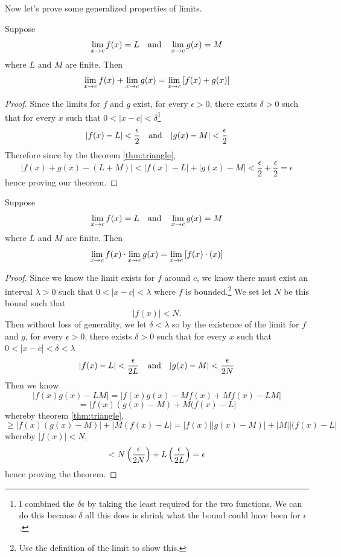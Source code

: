 Now let's prove some generalized properties of limits.

\begin{theorem}
Suppose
$$\lim_{x\to c}f(x)=L \quad\text{and}\quad \lim_{x\to c}g(x)=M$$
where $L$ and $M$ are finite. Then
$$\lim_{x\to c}f(x)+\lim_{x\to c}g(x)=\lim_{x\to c}\left[f(x)+g(x)\right]$$
\end{theorem}
\begin{proof}
	Since the limits for $f$ and $g$ exist, for every $\epsilon>0$, there exists $\delta>0$ such that for every $x$ such that $0<|x-c|<\delta$\footnote{I combined the $\delta$s by taking the least required for the two functions. We can do this because $\delta$ all this does is shrink what the bound could have been for $\epsilon$.}
	$$|f(x)-L|<\frac{\epsilon}{2} \quad\text{and}\quad |g(x)-M|<\frac{\epsilon}{2}$$
	Therefore since by the theorem \eqref{thm:triangle},
	$$|f(x)+g(x)-(L+M)|<|f(x)-L|+|g(x)-M|<\frac{\epsilon}{2}+\frac{\epsilon}{2}=\epsilon$$
	hence proving our theorem.
\end{proof}

\begin{theorem}
Suppose
$$\lim_{x\to c}f(x)=L \quad\text{and}\quad \lim_{x\to c}g(x)=M$$
where $L$ and $M$ are finite. Then
$$\lim_{x\to c}f(x)\cdot\lim_{x\to c}g(x)=\lim_{x\to c}\left[f(x)\cdot(x)\right]$$
\end{theorem}
\begin{proof}
	Since we know the limit exists for $f$ around $c$, we know there must exist an interval $\lambda>0$ such that $0<|x-c|<\lambda$ where $f$ is bounded.\footnote{
	Use the definition of the limit to show this.}
	We set let $N$ be this bound such that 
	$$|f(x)|<N.$$
	Then without loss of generality, we let $\delta<\lambda$ so by the existence of the limit for $f$ and $g$, for every $\epsilon>0$, there exists $\delta>0$ such that for every $x$ such that $0<|x-c|<\delta<\lambda$
	$$|f(x)-L|<\frac{\epsilon}{2L} \quad\text{and}\quad |g(x)-M|<\frac{\epsilon}{2N}$$
	Then we know
	$$|f(x)g(x)-LM|=|f(x)g(x)-Mf(x)+Mf(x)-LM|$$
	$$=|f(x)(g(x)-M)+M(f(x)-L|$$
	whereby theorem \eqref{thm:triangle},
	$$\ge |f(x)(g(x)-M)|+|M(f(x)-L|=|f(x)||g(x)-M)|+|M||(f(x)-L|$$
	whereby $|f(x)|<N$,
	$$<N\left(\frac{\epsilon}{2N}\right)+L\left(\frac{\epsilon}{2L}\right)=\epsilon$$
	hence proving the theorem.
\end{proof}

